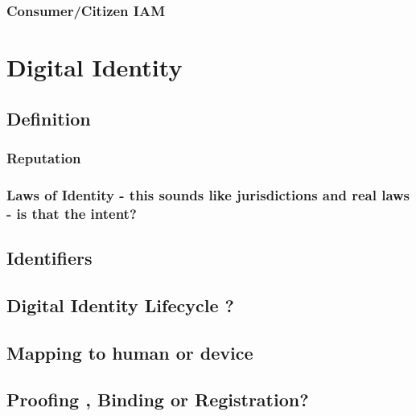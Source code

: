 \hypertarget{consumercitizen-iam}{%
\subsection{Consumer/Citizen IAM}\label{consumercitizen-iam}}

\hypertarget{digital-identity}{%
\chapter{Digital Identity}\label{digital-identity}}

\hypertarget{definition}{%
\section{Definition}\label{definition}}

\hypertarget{reputation}{%
\subsection{Reputation}\label{reputation}}

\hypertarget{laws-of-identity---this-sounds-like-jurisdictions-and-real-laws---is-that-the-intent}{%
\subsection{Laws of Identity - this sounds like jurisdictions and
real laws - is that the
intent?}\label{laws-of-identity---this-sounds-like-jurisdictions-and-real-laws---is-that-the-intent}}

\hypertarget{identifiers}{%
\section{Identifiers}\label{identifiers}}

\hypertarget{digital-identity-lifecycle}{%
\section{Digital Identity Lifecycle
?}\label{digital-identity-lifecycle}}

\hypertarget{mapping-to-human-or-device}{%
\section{Mapping to human or
device}\label{mapping-to-human-or-device}}

\hypertarget{proofing-binding-or-registration}{%
\section{Proofing , Binding or
Registration?}\label{proofing-binding-or-registration}}

